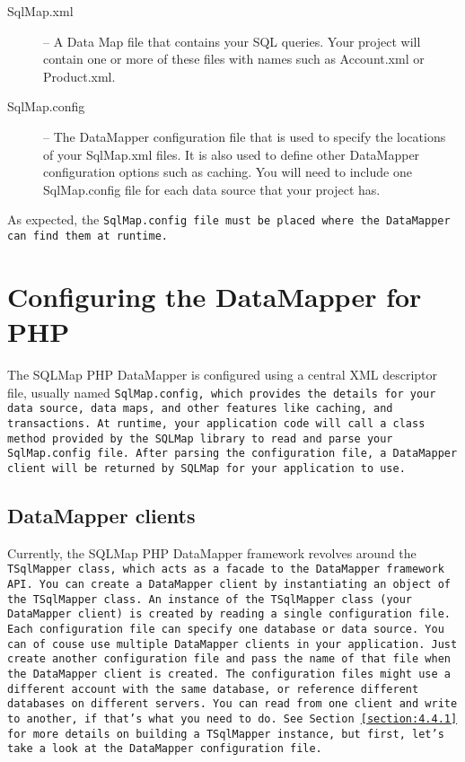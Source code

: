\begin{description}
  \item[SqlMap.xml] --
  A Data Map file that contains your SQL queries. Your project will contain one
  or more of these files with names such as Account.xml or Product.xml.

  \item[SqlMap.config] --
    The DataMapper configuration file that is used to specify the locations of your
    SqlMap.xml files. It is also used to define other DataMapper
   configuration options such as caching. You will need to include one SqlMap.config
   file for each data source that your project has.
\end{description}

As expected, the \tt{SqlMap.config} file must be placed where the DataMapper
can find them at runtime.

\section{Configuring the DataMapper for PHP}
The SQLMap PHP DataMapper is configured using a central XML descriptor file,
usually named \tt{SqlMap.config}, which provides the details for your data
source, data maps, and other features like caching, and transactions. At
runtime, your application code will call a class method provided by the SQLMap
library to read and parse your \tt{SqlMap.config} file. After parsing the
configuration file, a DataMapper client will be returned by SQLMap for your
application to use.

\subsection{DataMapper clients}
Currently, the SQLMap PHP DataMapper framework revolves around the
\tt{TSqlMapper} class, which acts as a facade to the DataMapper framework API.
You can create a DataMapper client by instantiating an object of the
\tt{TSqlMapper} class. An instance of the \tt{TSqlMapper} class (your
DataMapper client) is created by reading a single configuration file. Each
configuration file can specify one database or data source. You can of couse
use multiple DataMapper clients in your application. Just create another
configuration file and pass the name of that file when the DataMapper client
is created. The configuration files might use a different account with the
same database, or reference different databases on different servers. You can
read from one client and write to another, if that's what you need to do. See
Section~\ref{section:4.4.1} for more details on building a \tt{TSqlMapper}
instance, but first, let's take a look at the DataMapper configuration file.

